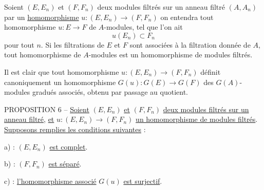 Soient $(E,E_n)$ et $(F,F_n)$ deux modules filtrés sur un anneau filtré $(A,A_n)$ par un \uline{homomorphisme} $u:(E,E_n)\longrightarrow(F,F_n)$ on entendra tout homomorphisme $u:E\longrightarrow F$ de $A$-modules, tel que l'on ait
\[
u(E_n)\subset F_n
\]
pour tout $n$. Si les filtrations de $E$ et $F$ sont associées à la filtration donnée de $A$, tout homomorphisme de $A$-modules est un homomorphisme de modules filtrés.

Il est clair que tout homomorphisme $u:(E,E_n)\longrightarrow(F,F_n)$ définit canoniquement un homomorphisme $G(u):G(E)\longrightarrow G(F)$ des $G(A)$-modules gradués associés, obtenu par passage au quotient.

PROPOSITION 6 -- \uline{Soient} $(E,E_n)$ \uline{et} $(F,F_n)$ \uline{deux modules filtrés sur un anneau filtré}, \uline{et} $u:(E,E_n)\longrightarrow(F,F_n)$ \uline{un homomorphisme de modules filtrés}. \uline{Supposons remplies les conditions suivantes} :

a) : $(E,E_n)$ \uline{est complet}.

b) : $(F,F_n)$ \uline{est séparé}.

c) : \uline{l'homomorphisme associé} $G(u)$ \uline{est surjectif}.


